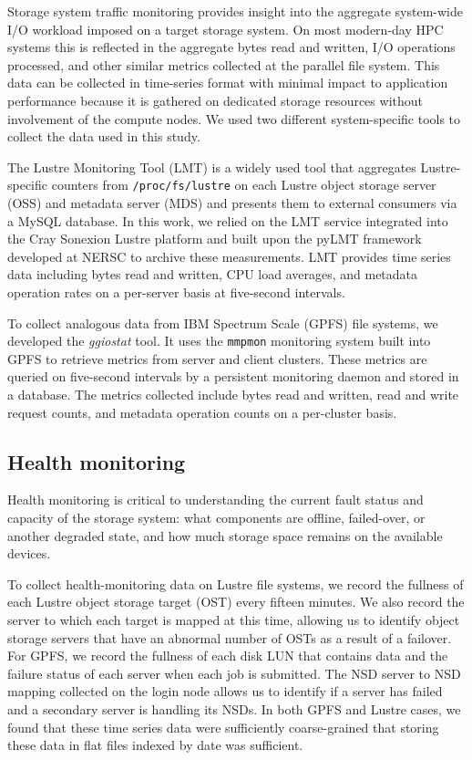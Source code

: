 Storage system traffic monitoring provides insight into the aggregate system-wide I/O workload imposed on a target storage system.
On most modern-day HPC systems this is reflected in the aggregate bytes read
and written, I/O operations processed, and other similar metrics collected at
the parallel file system.  This data can be collected in time-series format
with minimal impact to application performance because it is gathered on
dedicated storage resources without involvement of the compute nodes.
We used two different system-specific tools to collect the data used in this study.

\label{sec:methods/lmt}
The Lustre Monitoring Tool (LMT) is a widely used tool that aggregates Lustre-specific counters from \texttt{/proc/fs/lustre} on each Lustre object storage server (OSS) and metadata server (MDS) and presents them to external consumers via a MySQL database.
In this work, we relied on the LMT service integrated into the Cray Sonexion Lustre platform \cite{Keopp2014} and built upon the pyLMT framework developed at NERSC \cite{Uselton2009} to archive these measurements.
LMT provides time series data including bytes read and written, CPU load averages, and metadata operation rates on a per-server basis at five-second intervals.

\label{sec:methods/ggiostat}
To collect analogous data from IBM Spectrum Scale (GPFS) file systems, we developed the \emph{ggiostat} tool.
It uses the \texttt{mmpmon} monitoring system built into GPFS to retrieve metrics from server and client clusters.
These metrics are queried on five-second intervals by a persistent monitoring daemon and stored in a database.
The metrics collected include bytes read and written, read and write request counts, and metadata operation counts on a per-cluster basis.

\subsection{Health monitoring} \label{sec:methods/health}

Health monitoring is critical to understanding the current fault status and capacity of the
storage system: what components are offline, failed-over, or another degraded state, and how much storage space remains on the available devices.

To collect health-monitoring data on Lustre file systems, we record the fullness of each Lustre object storage target (OST) every fifteen minutes.
We also record the server to which each target is mapped at this time, allowing us to identify object storage servers that have an abnormal number of OSTs as a result of a failover.
For GPFS, we record the fullness of each disk LUN that contains data and the failure status of each server when each job is submitted.
The NSD server to NSD mapping collected on the login node allows us to identify if a server has failed and a secondary server is handling its NSDs.
In both GPFS and Lustre cases, we found that these time series data were sufficiently coarse-grained that storing these data in flat files indexed by date was sufficient.

